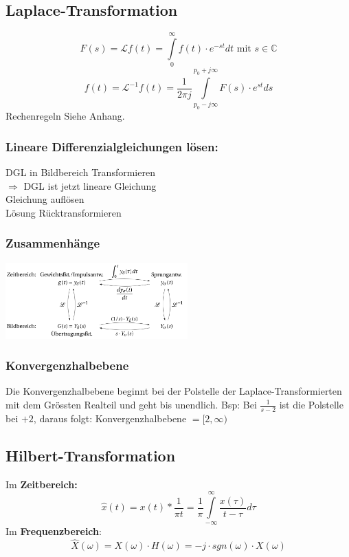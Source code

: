 \subsection{Laplace-Transformation}
\begin{multicols}{2}

  $$F(s) = \mathscr{L} {f(t)} = \int \limits _{0} ^{\infty} f(t) \cdot e^{-st} dt \textrm{ mit } s \in \mathbb{C}$$
  $$f(t) = \mathscr{L}^{-1} {f(t)} = \frac{1}{2\pi j} \int \limits _{p_0-j\infty} ^{p_0 + j\infty} F(s) \cdot e^{st} ds$$
  Rechenregeln Siehe Anhang.
  \subsubsection*{Lineare Differenzialgleichungen lösen:}
  DGL in Bildbereich Transformieren \\ $\Rightarrow$ DGL ist jetzt lineare Gleichung
  \\Gleichung auflösen
  \\Lösung Rücktransformieren

  \subsubsection*{Zusammenhänge}
  \includegraphics[width = 7cm]{include/Integraltransformationen/img/Zusammenhang_Laplace.png}

  \subsubsection*{Konvergenzhalbebene}
  Die Konvergenzhalbebene beginnt bei der Polstelle der Laplace-Transformierten mit dem Grössten Realteil und geht bis unendlich.
  \newline Bsp: Bei $\frac{1}{s-2}$ ist die Polstelle bei $+2$, daraus folgt: Konvergenzhalbebene $= [2,\infty)$
\end{multicols}

\subsection{Hilbert-Transformation}
\begin{multicols}{2}
  Im \textbf{Zeitbereich:}
  $$\hat{x}(t) = x(t) * \frac{1}{\pi t} = \frac{1}{\pi} \int \limits _{-\infty} ^{\infty} \frac{x(\tau)}{t-\tau} d\tau$$
  Im \textbf{Frequenzbereich}:
  $$\hat{X}(\omega) = X(\omega) \cdot H(\omega) = -j \cdot sgn(\omega) \cdot X(\omega)$$
\end{multicols}
